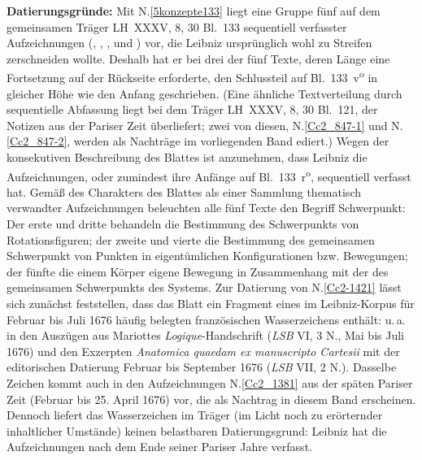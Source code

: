 \begin{ledgroup}
\footnotesize
\pstart
\noindent
\textbf{Datierungsgründe:}
Mit N.\;\ref{5konzepte133} liegt
eine Gruppe fünf auf dem gemeinsamen Träger LH~XXXV, 8, 30 Bl.~133
sequentiell verfasster Aufzeichnungen 
(, , ,  und )
vor,
die Leibniz ursprünglich wohl zu Streifen zerschneiden wollte.
Deshalb hat er bei drei der fünf Texte, deren Länge eine Fortsetzung auf der Rückseite erforderte, den Schlussteil auf Bl.~133~v\textsuperscript{o} in gleicher Höhe wie den Anfang geschrieben. (Eine ähnliche Textverteilung durch sequentielle Abfassung liegt bei dem Träger LH~XXXV, 8, 30 Bl.~121, der Notizen aus der Pariser Zeit überliefert; zwei von diesen, N.\;\ref{Cc2_847-1} und N.\;\ref{Cc2_847-2}, werden als Nachträge im vorliegenden Band ediert.)
Wegen der konsekutiven Beschreibung des Blattes ist anzunehmen, dass Leibniz die Aufzeichnungen, oder zumindest ihre Anfänge auf Bl.~133~r\textsuperscript{o}, sequentiell verfasst hat.
Gemäß des Charakters des Blattes als einer Sammlung thematisch verwandter Aufzeichnungen beleuchten alle fünf Texte den Begriff Schwerpunkt: Der erste und dritte behandeln die Bestimmung des Schwerpunkts von Rotationsfiguren; der zweite und vierte die Bestimmung des gemeinsamen Schwerpunkt von Punkten in eigentümlichen Konfigurationen bzw. Bewegungen; der fünfte die einem Körper eigene Bewegung in Zusammenhang mit der des gemeinsamen Schwerpunkts des Systems.
\pend
\pstart
Zur Datierung von N.\;\ref{Cc2-1421} lässt sich zunächst feststellen, dass das Blatt ein Fragment eines 
im Leibniz-Korpus für Februar bis Juli 1676 häufig belegten französischen Wasserzeichens enthält: 
u.\,a. in den
\cite{02169}Auszügen aus 
Mariottes  \textit{Logique}-Handschrift (\textit{LSB} VI, 3 N., Mai bis Juli 1676)
und den Exzerpten \cite{02170}\textit{Anatomica quaedam ex manuscripto Cartesii} mit der editorischen Datierung Februar bis September 1676 (\textit{LSB} VII, 2 N.).
Dasselbe Zeichen kommt auch in den Aufzeichnungen N.\;\ref{Cc2_1381} aus der späten Pariser Zeit (Februar bis 25. April 1676) vor, die als Nachtrag in diesem Band erscheinen.
Dennoch liefert das Wasserzeichen im Träger (im Licht noch zu erörternder inhaltlicher Umstände) keinen belastbaren Datierungsgrund: Leibniz hat die Aufzeichnungen nach dem Ende seiner Pariser Jahre verfasst.

\end{ledgroup}

